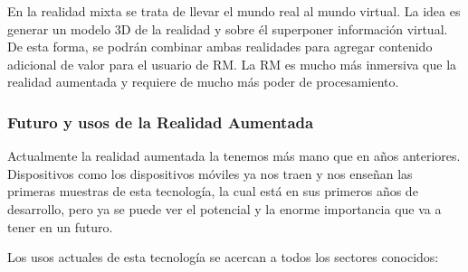 En la realidad mixta se trata de llevar el mundo real al mundo virtual. La idea es generar un modelo 3D de la realidad y sobre él superponer información virtual. De esta forma, se podrán combinar ambas realidades para agregar contenido adicional de valor para el usuario de RM. La RM es mucho más inmersiva que la realidad aumentada y requiere de mucho más poder de procesamiento. 

\subsubsection{Futuro y usos de la Realidad Aumentada}
Actualmente la realidad aumentada la tenemos más mano que en años anteriores. Dispositivos como los dispositivos móviles ya nos traen y nos enseñan las primeras muestras de esta tecnología, la cual está en sus primeros años de desarrollo, pero ya se puede ver el potencial y la enorme importancia que va a tener en un futuro.

Los usos actuales de esta tecnología se acercan a todos los sectores conocidos:

